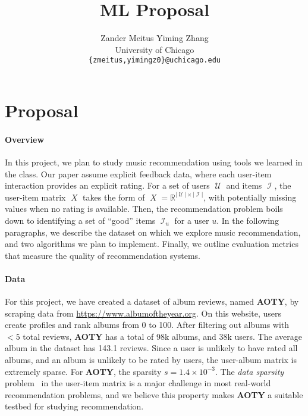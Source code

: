\documentclass{article}
\title{ML Proposal}
\author{
  Zander Meitus \qquad Yiming Zhang \\
  University of Chicago \\
  \texttt{\{zmeitus,yimingz0\}@uchicago.edu}
}
\newcommand{\aoty}{{\bf AOTY}\xspace}
\DeclareMathOperator{\X}{\mathit{X}}
\DeclareMathOperator{\U}{\mathcal{U}}
\DeclareMathOperator{\I}{\mathcal{I}}
\newcommand{\card}[1]{\ensuremath{\lvert {#1} \rvert}}
\begin{document}
\maketitle

\section{Proposal}


\paragraph{Overview}
In this project, we plan to study music recommendation using tools we learned
 in the class.
Our paper assume explicit feedback data, where each user-item interaction
 provides an explicit rating.
For a set of users $\U$ and items $\I$, the user-item matrix $\X$ takes the
 form of $\X = \mathbb{R}^{\card{\U} \times \card{\I}}$, with potentially
 missing values when no rating is available.
Then, the recommendation problem boils down to identifying a set of ``good''
 items $\I_u$ for a user $u$.
In the following paragraphs, we describe the dataset on which we explore music
 recommendation, and two algorithms we plan to implement.
Finally, we outline evaluation metrics that measure the quality of
 recommendation systems.

\paragraph*{Data}
For this project, we have created a dataset of album reviews, named \aoty, by
 scraping data from \url{https://www.albumoftheyear.org}.
On this website, users create profiles and rank albums from 0 to 100.
After filtering out albums with $<5$ total reviews, \aoty has a total of 98k
 albums, and 38k users.
The average album in the dataset has 143.1 reviews.
Since a user is unlikely to have rated all albums, and an album is unlikely to
 be rated by users, the user-album matrix is extremely sparse.
For \aoty, the sparsity $s = 1.4 \times 10^{-3}$.
The {\em data sparsity} problem~\citep{suSurveyCollaborativeFiltering2009} in
 the user-item matrix is a major challenge in most real-world recommendation
 problems, and we believe this property makes \aoty a suitable testbed for
 studying recommendation.
\end{document}
